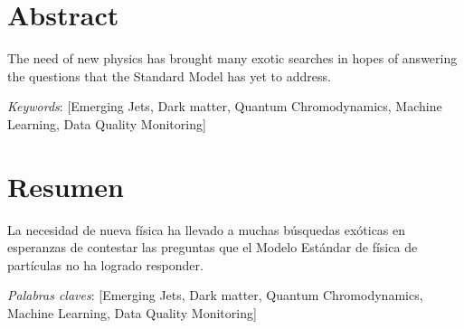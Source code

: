 \chapter{Abstract}

The need of new physics has brought many exotic searches in hopes of answering the questions that the Standard Model has yet to address.

\vspace*{1cm}

\textit{Keywords}:  [Emerging Jets, Dark matter, Quantum Chromodynamics, Machine Learning, Data Quality Monitoring]


\chapter{Resumen}
La necesidad de nueva física ha llevado a muchas búsquedas exóticas en esperanzas de contestar las preguntas que el Modelo Estándar de física de partículas no ha logrado responder.


\vspace*{1cm}

\textit{Palabras claves}:  [Emerging Jets, Dark matter, Quantum Chromodynamics, Machine Learning, Data Quality Monitoring]
